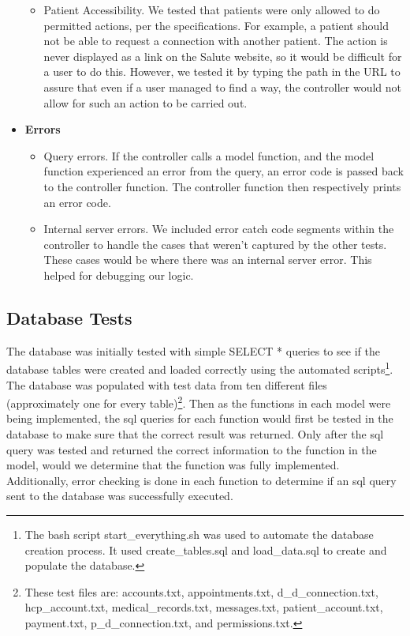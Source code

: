 \documentclass[10pt]{report}
\begin{document}
\begin{itemize}
\begin{itemize}
\item Patient Accessibility. We tested that patients were only allowed to do permitted actions, per the specifications. For example, a patient should not be able to request a connection with another patient. The action is never displayed as a link on the Salute website, so it would be difficult for a user to do this. However, we tested it by typing the path in the URL to assure that even if a user managed to find a way, the controller would not allow for such an action to be carried out. 
\end{itemize}
\item \textbf{Errors}
\begin{itemize} 
\item Query errors. If the controller calls a model function, and the model function experienced an error from the query, an error code is passed back to the controller function. The controller function then respectively prints an error code. 
\item Internal server errors. We included error catch code segments within the controller to handle the cases that weren't captured by the other tests. These cases would be where there was an internal server error. This helped for debugging our logic.  
\end{itemize}
\end{itemize}


\subsection{Database Tests}
The database was initially tested with simple SELECT * queries to see if the database tables were created and loaded correctly using the automated scripts\footnote{The bash script start\_everything.sh was used to automate the database creation process.  It used create\_tables.sql and load\_data.sql to create and populate the database.}. The database was populated with test data from ten different files (approximately one for every table)\footnote{These test files are: accounts.txt, appointments.txt, d\_d\_connection.txt, hcp\_account.txt, medical\_records.txt, messages.txt, patient\_account.txt, payment.txt, p\_d\_connection.txt, and permissions.txt.}.  Then as the functions in each model were being implemented, the sql queries for each function would first be tested in the database to make sure that the correct result was returned.  Only after the sql query was tested and returned the correct information to the function in the model, would we determine that the function was fully implemented.  Additionally, error checking is done in each function to determine if an sql query sent to the database was successfully executed.
\end{document}
